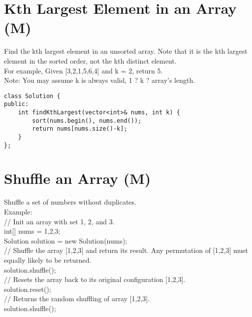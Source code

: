 \section{Kth Largest Element in an Array (M)}
Find the kth largest element in an unsorted array. Note that it is the kth largest element in the sorted order, not the kth distinct element.\\

For example,
Given [3,2,1,5,6,4] and k = 2, return 5.\\

Note:
You may assume k is always valid, 1 ? k ? array's length.\\

\begin{lstlisting}
class Solution {
public:
    int findKthLargest(vector<int>& nums, int k) {   
        sort(nums.begin(), nums.end());
        return nums[nums.size()-k];
    }
};
\end{lstlisting}


\section{Shuffle an Array (M)}
Shuffle a set of numbers without duplicates.\\

Example:\\
// Init an array with set 1, 2, and 3.\\
int[] nums = {1,2,3};\\
Solution solution = new Solution(nums);\\

// Shuffle the array [1,2,3] and return its result. Any permutation of [1,2,3] must equally likely to be returned.\\
solution.shuffle();\\

// Resets the array back to its original configuration [1,2,3].\\
solution.reset();\\

// Returns the random shuffling of array [1,2,3].\\
solution.shuffle();\\

